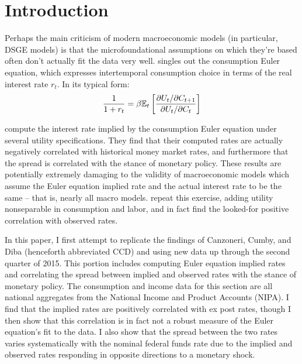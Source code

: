 \section{Introduction}
Perhaps the main criticism of modern macroeconomic models (in particular, DSGE models) is that the microfoundational assumptions on which they're based often don't actually fit the data very well. \cite{smith14} singles out the consumption Euler equation, which expresses intertemporal consumption choice in terms of the real interest rate $r_t$. In its typical form: $$\frac{1}{1 + r_t} = \beta \mathbb{E}_t \left[  \frac{\partial U_t / \partial C_{t+1}}{\partial U_t / \partial C_t}  \right]$$

\cite{canzoneri07} compute the interest rate implied by the consumption Euler equation under several utility specifications. They find that their computed rates are actually negatively correlated with historical money market rates, and furthermore that the spread is correlated with the stance of monetary policy. These results are potentially extremely damaging to the validity of macroeconomic models which assume the Euler equation implied rate and the actual interest rate to be the same -- that is, nearly all macro models. \cite{collard11} repeat this exercise, adding utility nonseparable in consumption and labor, and in fact find the looked-for positive correlation with observed rates.

In this paper, I first attempt to replicate the findings of Canzoneri, Cumby, and Diba (henceforth abbreviated CCD) and \cite{collard11} using new data up through the second quarter of 2015.  This portion includes computing Euler equation implied rates and correlating the spread between implied and observed rates with the stance of monetary policy. The consumption and income data for this section are all national aggregates from the National Income and Product Accounts (NIPA). I find that the implied rates are positively correlated with ex post rates, though I then show that this correlation is in fact not a robust measure of the Euler equation's fit to the data. I also show that the spread between the two rates varies systematically with the nominal federal funds rate due to the implied and observed rates responding in opposite directions to a monetary shock.

